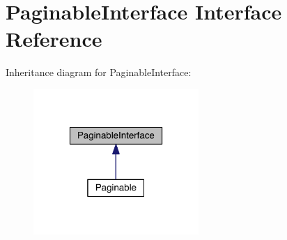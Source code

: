 \hypertarget{interfaceapp_1_1models_1_1core_1_1_pagination_1_1_paginable_interface}{\section{Paginable\-Interface Interface Reference}
\label{interfaceapp_1_1models_1_1core_1_1_pagination_1_1_paginable_interface}
}


Inheritance diagram for Paginable\-Interface\-:
\nopagebreak
\begin{figure}[H]
\begin{center}
\leavevmode
\includegraphics[width=178pt]{interfaceapp_1_1models_1_1core_1_1_pagination_1_1_paginable_interface__inherit__graph}
\end{center}
\end{figure}
